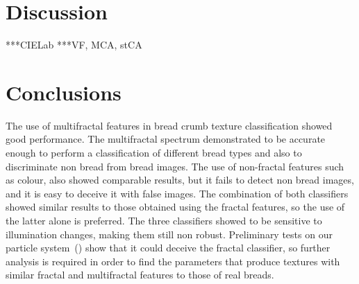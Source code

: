 



\section{Discussion}
\label{sec:11}
***CIELab
***VF, MCA, stCA

\section{Conclusions}
\label{sec:12}
The use of multifractal features in bread crumb texture classification showed good performance. The multifractal spectrum demonstrated to be accurate enough to perform a classification of different bread types and also to discriminate non bread from bread images. The use of non-fractal features such as colour, also showed comparable results, but it fails to detect non bread images, and it is easy to deceive it with false images. The combination of both classifiers showed similar results to those obtained using the fractal features, so the use of the latter alone is preferred. The three classifiers showed to be sensitive to illumination changes, making them still non robust. Preliminary tests on our particle system~(\cite{Baravalle2011}) show that it could deceive the fractal classifier, so further analysis is required in order to find the parameters that produce textures with similar fractal and multifractal features to those of real breads.

